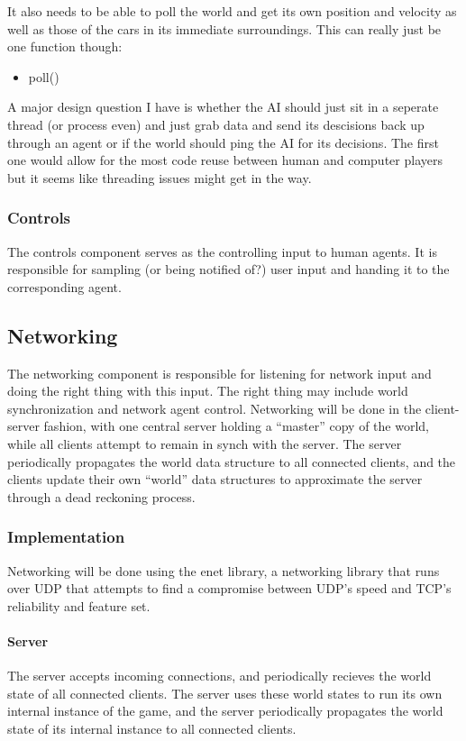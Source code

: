 \documentclass[12pt]{article}
\begin{document}
It also needs to be able to poll the world and get its own position and velocity as well as those of the cars in its immediate surroundings. This can really just be one function though:
\begin{itemize}
\item poll()
\end{itemize}
A major design question I have is whether the AI should just sit in a seperate thread (or process even) and just grab data and send its descisions back up through an agent or if the world should ping the AI for its decisions. The first one would allow for the most code reuse between human and computer players but it seems like threading issues might get in the way.

\subsubsection{Controls}
The controls component serves as the controlling input to human agents. It
is responsible for sampling (or being notified of?) user input and handing it
to the corresponding agent.
\subsection{Networking}
The networking component is responsible for listening for network input and
doing the right thing with this input. The right thing may include world
synchronization and network agent control.  Networking will be done in the client-server fashion, with one central server holding a ``master'' copy of the world, while all clients attempt to remain in synch with the server.  The server periodically propagates the world data structure to all connected clients, and the clients update their own ``world'' data structures to approximate the server through a dead reckoning process.

\subsubsection{Implementation}

Networking will be done using the enet library, a networking library that runs over UDP that attempts to find a compromise between UDP's speed and TCP's reliability and feature set.

\paragraph{Server}
The server accepts incoming connections, and periodically recieves the world state of all connected clients.  The server uses these world states to run its own internal instance of the game, and the server periodically propagates the world state of its internal instance to all connected clients.  
\end{document}
